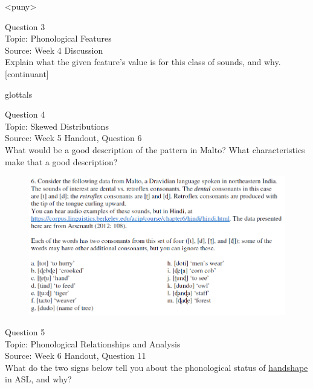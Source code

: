 \documentclass[12pt]{article}
\begin{document}
<puny>


\newpage

{\large Question 3}\\

Topic: Phonological Features\\
Source: Week 4 Discussion\\

Explain what the given feature’s value is for this class of sounds, and why.\\

{[continuant]}

glottals


\newpage

{\large Question 4}\\

Topic: Skewed Distributions\\
Source: Week 5 Handout, Question 6\\

What would be a good description of the pattern in Malto? What characteristics make that a good description?\\

\begin{figure}[H]
\includegraphics{../images/malto.png}
\end{figure}

\newpage

{\large Question 5}\\

Topic: Phonological Relationships and Analysis\\
Source: Week 6 Handout, Question 11\\

What do the two signs below tell you about the phonological status of \underline{handshape} in ASL, and why?\\
\end{document}
